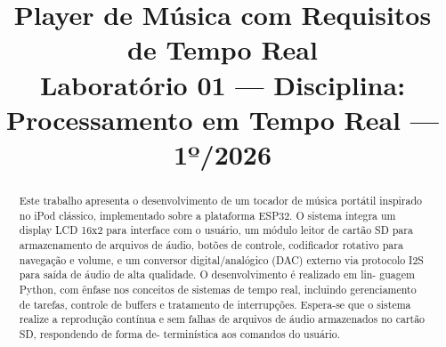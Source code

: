 \documentclass[conference]{IEEEtran}
\begin{document}
\title{Player de Música com Requisitos de Tempo Real\\
{\footnotesize Laboratório 01 — Disciplina: Processamento em Tempo Real — 1º/2026}
}

\author{
\and
{}
\and
{}
}

\maketitle

\begin{abstract}
Este trabalho apresenta o desenvolvimento de um tocador de música
portátil inspirado no iPod clássico, implementado sobre a plataforma
ESP32. O sistema integra um display LCD 16x2 para interface com o
usuário, um módulo leitor de cartão SD para armazenamento de arquivos
de áudio, botões de controle, codificador rotativo para navegação e volume,
e um conversor digital/analógico (DAC) externo via protocolo I2S para
saída de áudio de alta qualidade. O desenvolvimento é realizado em lin-
guagem Python, com ênfase nos conceitos de sistemas de tempo real, incluindo
gerenciamento de tarefas, controle de buffers e tratamento de interrupções.
Espera-se que o sistema realize a reprodução contínua e sem falhas de
arquivos de áudio armazenados no cartão SD, respondendo de forma de-
terminística aos comandos do usuário.
\end{abstract}
\end{document}
